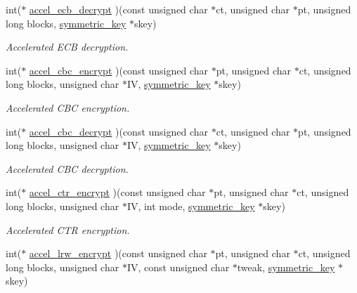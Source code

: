 \begin{DoxyCompactItemize}
int($\ast$ \mbox{\hyperlink{structltc__cipher__descriptor_a58a17db0160fa95e4e7ca31aa78baa5d}{accel\+\_\+ecb\+\_\+decrypt}} )(const unsigned char $\ast$ct, unsigned char $\ast$pt, unsigned long blocks, \mbox{\hyperlink{tomcrypt__cipher_8h_ac5a146550efe94c415d95abc7e454362}{symmetric\+\_\+key}} $\ast$skey)
\begin{DoxyCompactList}\small\item\em Accelerated E\+CB decryption. \end{DoxyCompactList}\item 
int($\ast$ \mbox{\hyperlink{structltc__cipher__descriptor_af9a1617014aadff2e5f30e1fb2c06bbd}{accel\+\_\+cbc\+\_\+encrypt}} )(const unsigned char $\ast$pt, unsigned char $\ast$ct, unsigned long blocks, unsigned char $\ast$IV, \mbox{\hyperlink{tomcrypt__cipher_8h_ac5a146550efe94c415d95abc7e454362}{symmetric\+\_\+key}} $\ast$skey)
\begin{DoxyCompactList}\small\item\em Accelerated C\+BC encryption. \end{DoxyCompactList}\item 
int($\ast$ \mbox{\hyperlink{structltc__cipher__descriptor_ad5d884a0bcec283aafbedda7d91a752b}{accel\+\_\+cbc\+\_\+decrypt}} )(const unsigned char $\ast$ct, unsigned char $\ast$pt, unsigned long blocks, unsigned char $\ast$IV, \mbox{\hyperlink{tomcrypt__cipher_8h_ac5a146550efe94c415d95abc7e454362}{symmetric\+\_\+key}} $\ast$skey)
\begin{DoxyCompactList}\small\item\em Accelerated C\+BC decryption. \end{DoxyCompactList}\item 
int($\ast$ \mbox{\hyperlink{structltc__cipher__descriptor_a6370d8bf30ee437549646d30c0e31e16}{accel\+\_\+ctr\+\_\+encrypt}} )(const unsigned char $\ast$pt, unsigned char $\ast$ct, unsigned long blocks, unsigned char $\ast$IV, int mode, \mbox{\hyperlink{tomcrypt__cipher_8h_ac5a146550efe94c415d95abc7e454362}{symmetric\+\_\+key}} $\ast$skey)
\begin{DoxyCompactList}\small\item\em Accelerated C\+TR encryption. \end{DoxyCompactList}\item 
int($\ast$ \mbox{\hyperlink{structltc__cipher__descriptor_afdd0e85b2d837faac7d4e50a8109cc77}{accel\+\_\+lrw\+\_\+encrypt}} )(const unsigned char $\ast$pt, unsigned char $\ast$ct, unsigned long blocks, unsigned char $\ast$IV, const unsigned char $\ast$tweak, \mbox{\hyperlink{tomcrypt__cipher_8h_ac5a146550efe94c415d95abc7e454362}{symmetric\+\_\+key}} $\ast$skey)

\end{DoxyCompactItemize}
